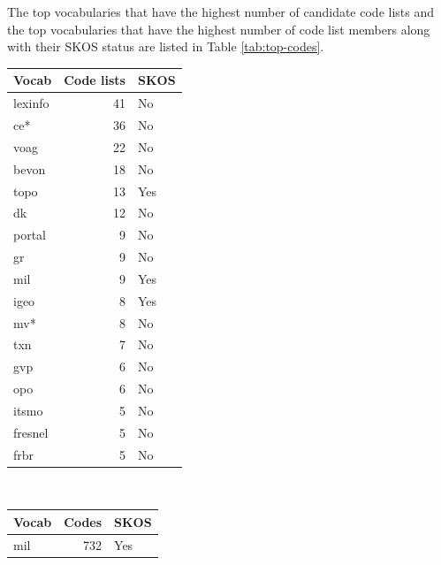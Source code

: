 The top vocabularies that have the highest number of candidate code lists and the top vocabularies that have the highest number of code list members along with their SKOS status are listed in Table \ref{tab:top-codes}.

\begin{table}[h]
\footnotesize
\begin{tabular}{|l|r|l|}
\hline
\textbf{Vocab} & \textbf{Code lists} & \textbf{SKOS} \\ \hline
lexinfo        & 41                  & No \\ \hline
ce*            & 36                  & No \\ \hline
voag           & 22                  & No \\ \hline
bevon          & 18                  & No \\ \hline
topo           & 13                  & Yes \\ \hline
dk             & 12                  & No  \\ \hline
portal         & 9                   & No  \\ \hline
gr             & 9                   & No  \\ \hline
mil            & 9                   & Yes \\ \hline
igeo           & 8                   & Yes \\ \hline
mv*            & 8                   & No  \\ \hline
txn            & 7                   & No  \\ \hline
gvp            & 6                   & No  \\ \hline
opo            & 6                   & No  \\ \hline
itsmo          & 5                   & No  \\ \hline
fresnel        & 5                   & No  \\ \hline
frbr           & 5                   & No  \\ \hline
\end{tabular}
\,
\begin{tabular}{|l|r|l|}
\hline
\textbf{Vocab} & \textbf{Codes} & \textbf{SKOS} \\ \hline
mil             & 732            & Yes    \\ \hline

\end{tabular}
\end{table}

